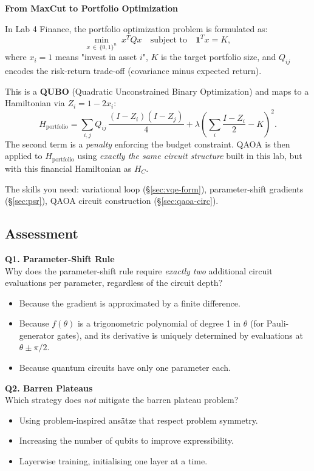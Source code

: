 \documentclass[a4paper,11pt]{article}
\begin{document}
\begin{bridgebox}
\textbf{From MaxCut to Portfolio Optimization}

In Lab 4 Finance, the portfolio optimization problem is formulated as:
\[
    \min_{x\,\in\,\{0,1\}^n}\; x^T Q x
    \quad\text{subject to}\quad \mathbf{1}^T x = K,
\]
where $x_i = 1$ means "invest in asset $i$", $K$ is the target portfolio
size, and $Q_{ij}$ encodes the risk-return trade-off (covariance minus
expected return).

This is a \textbf{QUBO} (Quadratic Unconstrained Binary Optimization) and
maps to a Hamiltonian via $Z_i = 1 - 2x_i$:
\[
    H_{\text{portfolio}} = \sum_{i,j} Q_{ij}\,\frac{(I-Z_i)(I-Z_j)}{4}
    + \lambda\!\left(\sum_i \frac{I-Z_i}{2} - K\right)^{\!2}.
\]
The second term is a \emph{penalty} enforcing the budget constraint.
QAOA is then applied to $H_{\text{portfolio}}$ using \emph{exactly the
same circuit structure} built in this lab, but with this financial
Hamiltonian as $H_C$.

The skills you need: variational loop (\S\ref{sec:vqe-form}),
parameter-shift gradients (\S\ref{sec:psr}), QAOA circuit
construction (\S\ref{sec:qaoa-circ}).
\end{bridgebox}

\subsection{Assessment}

\textbf{Q1. Parameter-Shift Rule}\\
Why does the parameter-shift rule require \emph{exactly two} additional
circuit evaluations per parameter, regardless of the circuit depth?
\begin{itemize}
    \item[A)] Because the gradient is approximated by a finite difference.
    \item[B)] Because $f(\theta)$ is a trigonometric polynomial of degree 1
              in $\theta$ (for Pauli-generator gates), and its derivative
              is uniquely determined by evaluations at $\theta \pm \pi/2$.
    \item[C)] Because quantum circuits have only one parameter each.
\end{itemize}

\vspace{0.3cm}
\textbf{Q2. Barren Plateaus}\\
Which strategy does \emph{not} mitigate the barren plateau problem?
\begin{itemize}
    \item[A)] Using problem-inspired ansätze that respect problem symmetry.
    \item[B)] Increasing the number of qubits to improve expressibility.
    \item[C)] Layerwise training, initialising one layer at a time.
\end{itemize}
\end{document}
